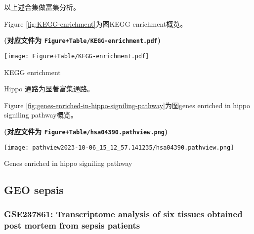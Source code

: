 \documentclass[
]{article}
\begin{document}
以上述合集做富集分析。

Figure \ref{fig:KEGG-enrichment}为图KEGG enrichment概览。

\textbf{(对应文件为 \texttt{Figure+Table/KEGG-enrichment.pdf})}

\def\@captype{figure}
\begin{center}
\texttt{[image: Figure+Table/KEGG-enrichment.pdf]}
\caption{KEGG enrichment}\label{fig:KEGG-enrichment}
\end{center}

Hippo 通路为显著富集通路。

Figure \ref{fig:genes-enriched-in-hippo-signiling-pathway}为图genes enriched in hippo signiling pathway概览。

\textbf{(对应文件为 \texttt{Figure+Table/hsa04390.pathview.png})}

\def\@captype{figure}
\begin{center}
\texttt{[image: pathview2023-10-06\_15\_12\_57.141235/hsa04390.pathview.png]}
\caption{Genes enriched in hippo signiling pathway}\label{fig:genes-enriched-in-hippo-signiling-pathway}
\end{center}

\hypertarget{geo-sepsis}{%
\subsection{GEO sepsis}\label{geo-sepsis}}

\hypertarget{gse237861-transcriptome-analysis-of-six-tissues-obtained-post-mortem-from-sepsis-patients}{%
\subsubsection{GSE237861: Transcriptome analysis of six tissues obtained post mortem from sepsis patients}\label{gse237861-transcriptome-analysis-of-six-tissues-obtained-post-mortem-from-sepsis-patients}}
\end{document}
